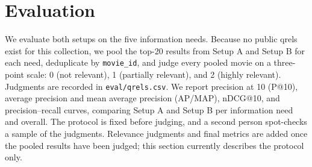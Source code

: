 
\section{Evaluation}
\label{sec:evaluation}

We evaluate both setups on the five information needs. Because no public qrels
exist for this collection, we pool the top-20 results from Setup A and Setup B for
each need, deduplicate by \texttt{movie\_id}, and judge every pooled movie on a
three-point scale: 0 (not relevant), 1 (partially relevant), and 2 (highly
relevant). Judgments are recorded in \texttt{eval/qrels.csv}. We report precision
at 10 (P@10), average precision and mean average precision (AP/MAP), nDCG@10, and
precision--recall curves, comparing Setup A and Setup B per information need and
overall. The protocol is fixed before judging, and a second person spot-checks a
sample of the judgments. Relevance judgments and final metrics are added once the
pooled results have been judged; this section currently describes the protocol
only.
